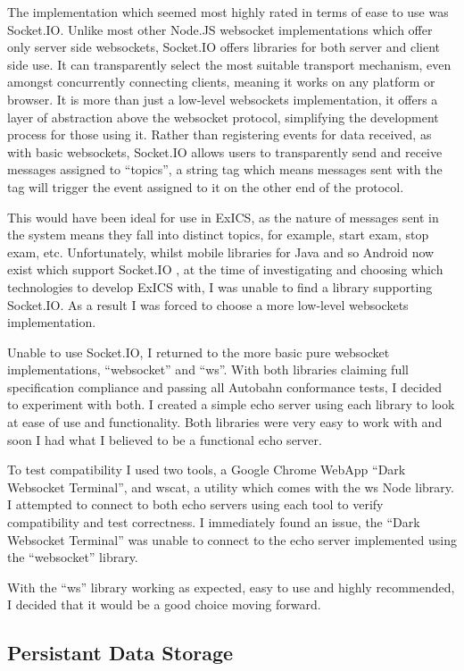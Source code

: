 The implementation which seemed most highly rated in terms of ease to use was Socket.IO.  Unlike most other Node.JS websocket implementations which offer only server side websockets, Socket.IO offers libraries for both server and client side use.  It can transparently select the most suitable transport mechanism, even amongst concurrently connecting clients, meaning it works on any platform or browser.  It is more than just a low-level websockets implementation, it offers a layer of abstraction above the websocket protocol, simplifying the development process for those using it.  Rather than registering events for data received, as with basic websockets, Socket.IO allows users to transparently send and receive messages assigned to ``topics'', a string tag which means messages sent with the tag will trigger the event assigned to it on the other end of the protocol.

This would have been ideal for use in ExICS, as the nature of messages sent in the system means they fall into distinct topics, for example, start exam, stop exam, etc.  Unfortunately, whilst mobile libraries for Java and so Android now exist which support Socket.IO \cite{AndroidAsync}, at the time of investigating and choosing which technologies to develop ExICS with, I was unable to find a library supporting Socket.IO.  As a result I was forced to choose a more low-level websockets implementation.

Unable to use Socket.IO, I returned to the more basic pure websocket implementations, ``websocket'' and ``ws''.  With both libraries claiming full specification compliance and passing all Autobahn conformance tests, I decided to experiment with both.  I created a simple echo server using each library to look at ease of use and functionality.  Both libraries were very easy to work with and soon I had what I believed to be a functional echo server.

To test compatibility I used two tools, a Google Chrome WebApp ``Dark Websocket Terminal''\cite{dwst}, and wscat, a utility which comes with the ws Node library.  I attempted to connect to both echo servers using each tool to verify compatibility and test correctness.  I immediately found an issue, the ``Dark Websocket Terminal'' was unable to connect to the echo server implemented using the ``websocket'' library.

With the ``ws'' library working as expected, easy to use and highly recommended, I decided that it would be a good choice moving forward.

\subsection{Persistant Data Storage}


